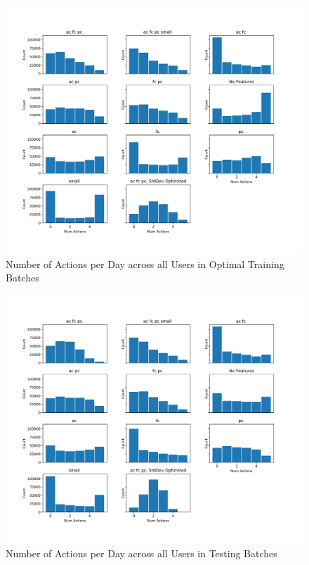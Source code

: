 	\begin{figure}[H]
	\includegraphics[width=1.5\textwidth,center]{figures/QM6train.png}%
	\caption{Number of Actions per Day across all Users in Optimal Training Batches}
	\label{QM6train}
	\end{figure}

	\begin{figure}[H]
	\includegraphics[width=1.5\textwidth,center]{figures/QM6test.png}%
	\caption{Number of Actions per Day across all Users in Testing Batches}
	\label{QM6test}
	\end{figure}

